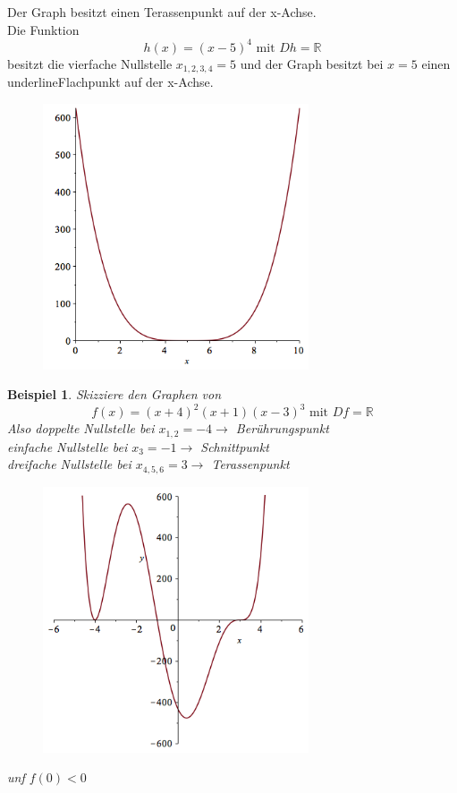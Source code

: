 \documentclass{report}
\newtheorem{myexample}{Beispiel}
\newcommand{\R}{{\mathbb R}}
\begin{document}
Der Graph besitzt einen Terassenpunkt auf der x-Achse.\\
\newpage
\noindent
Die Funktion
\begin{equation*}h(x) = (x-5)^4 \text{ mit } Dh = \R\end{equation*}
besitzt die vierfache Nullstelle $x_{1,2,3,4} = 5$ und der Graph besitzt bei $x=5$ einen underline{Flachpunkt} auf der x-Achse.\\
\begin{figure}[ht]
	\centering
\includegraphics[width=0.7\textwidth]{images/(x-5)^4.png}
\end{figure}
\newpage
\begin{myexample} 
	Skizziere den Graphen von
	\begin{equation*}
		f(x) = (x+4)^2 (x+1)(x-3)^3 \text{ mit } Df = \R 
	\end{equation*}
	Also doppelte Nullstelle bei $x_{1,2} = -4 \to$ Berührungspunkt\\
	einfache Nullstelle bei $x_3 = -1 \to$ Schnittpunkt\\
	dreifache Nullstelle bei $x_{4,5,6} = 3 \to$ Terassenpunkt\\
	\begin{figure}[H]
		\includegraphics[width=0.7\textwidth]{images/(x+4)^2(x+1)(x-3)^3.png}
	\end{figure}
	unf $f(0) < 0$
\end{myexample}
\newpage
\end{document}
